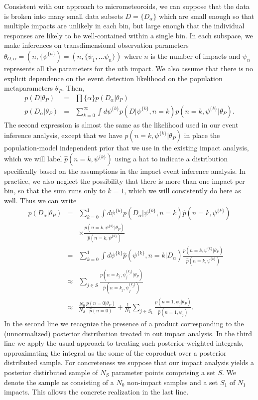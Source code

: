 \documentclass[twocolumn,showpacs,aps,prd,nobibnotes,nofootinbib,floatfix]{revtex4-1}
\begin{document}
Consistent with our approach to micrometeoroids, we can suppose that the data is broken into many small data subsets $D=\{D_\alpha\}$ which are small enough so that multiple impacts are unlikely in each bin, but large enough that the individual responses are likely to be well-contained within a single bin.
In each subspace, we make inferences on transdimensional observation parameters $\theta_{O,\alpha}=(n,\{\psi^{\{n\}})=(n,\{\psi_1,...\psi_n\})$ where $n$ is the number of impacts and $\psi_n$ represents all the parameters for the $n$th impact.  We also assume that there is no explicit dependence on the event detection likelihood on the population metaparameters $\theta_P$. Then,
\begin{eqnarray}
  p(D|\theta_P)&=&\prod{\{\alpha\}} p(D_\alpha|\theta_P)\\
  p(D_\alpha|\theta_P)&=&\sum_{k=0}^\infty\int d\psi^{\{k\}} p(D|\psi^{\{k\}},n=k)p(n=k,\psi^{\{k\}}|\theta_P).
\end{eqnarray}
The second expression is almost the same as the likelihood used in our event inference analysis, except that we have $p(n=k,\psi^{\{k\}}|\theta_P)$ in place the population-model independent prior that we use in the existing impact analysis, which we will label $\hat p(n=k,\psi^{\{k\}})$ using a hat to indicate a distribution specifically based on the assumptions in the impact event inference analysis. In practice, we also neglect the possibility that there is more than one impact per bin, so that the sum runs only to $k=1$, which we will consistently do here as well. Thus we can write
\begin{eqnarray}
  p(D_\alpha|\theta_P)&=&\sum_{k=0}^1\int d\psi^{\{k\}} p(D_\alpha|\psi^{\{k\}},n=k)\hat p(n=k,\psi^{\{k\}})\nonumber\\
  &&\times\frac{p(n=k,\psi^{\{k\}}|\theta_P)}{\hat p(n=k,\psi^{\{k\}})}\\
  &=&\sum_{k=0}^1\int d\psi^{\{k\}} \hat p(\psi^{\{k\}},n=k|D_\alpha)\frac{p(n=k,\psi^{\{k\}}|\theta_P)}{\hat p(n=k,\psi^{\{k\}})}\\
  &\approx&\sum_{j\in S}\frac{p(n=k_j,\psi_j^{\{k_j\}}|\theta_P)}{\hat p(n=k_j,\psi_j^{\{k_j\}})}\\
  &\approx&\frac{N_0}{N_S}\frac{p(n=0|\theta_P)}{\hat p(n=0)}+\frac1{N_1}\sum_{j\in S_1}\frac{p(n=1,\psi_j|\theta_P)}{\hat p(n=1,\psi_j)}.
\end{eqnarray}
In the second line we recognize the presence of a product corresponding to the (unnormalized) posterior distribution treated in out impact analysis.  In the third line we apply the usual approach to treating such posterior-weighted integrals, approximating the integral as the some of the coproduct over a posterior distributed sample.  For concreteness we suppose that our impact analysis yields a posterior distirbuted sample of $N_S$ parameter points comprising a set $S$.  We denote the sample as consisting of a $N_0$ non-impact samples and a set $S_1$ of $N_1$ impacts. This allows the concrete realization in the last line.
\end{document}
